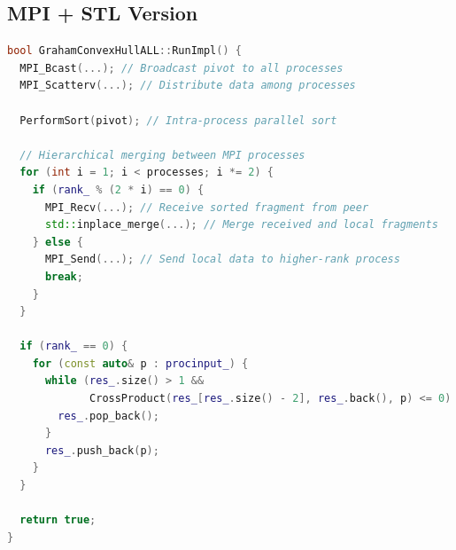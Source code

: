 \documentclass[12pt,a4paper]{extarticle}
\begin{document}
\subsection{MPI + STL Version}
\begin{lstlisting}[language=C++]
bool GrahamConvexHullALL::RunImpl() {
  MPI_Bcast(...); // Broadcast pivot to all processes
  MPI_Scatterv(...); // Distribute data among processes

  PerformSort(pivot); // Intra-process parallel sort

  // Hierarchical merging between MPI processes
  for (int i = 1; i < processes; i *= 2) {
    if (rank_ % (2 * i) == 0) {
      MPI_Recv(...); // Receive sorted fragment from peer
      std::inplace_merge(...); // Merge received and local fragments
    } else {
      MPI_Send(...); // Send local data to higher-rank process
      break;
    }
  }

  if (rank_ == 0) {
    for (const auto& p : procinput_) {
      while (res_.size() > 1 &&
             CrossProduct(res_[res_.size() - 2], res_.back(), p) <= 0) {
        res_.pop_back();
      }
      res_.push_back(p);
    }
  }

  return true;
}
\end{lstlisting}
\end{document}
